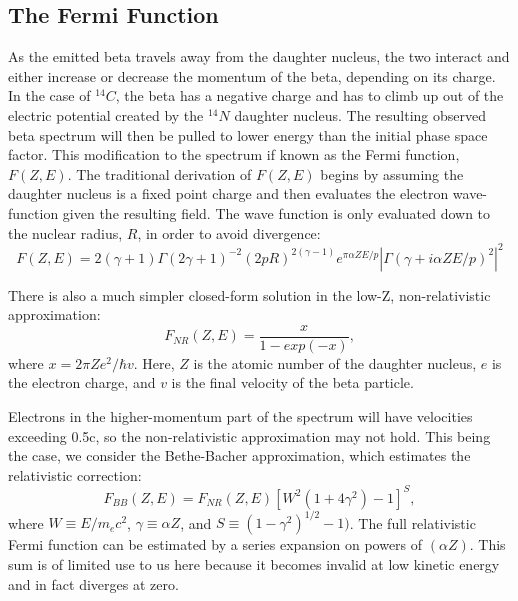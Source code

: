 \subsection{The Fermi Function}\label{sec:fermifunc}
As the emitted beta travels away from the daughter nucleus, the two interact and either increase or decrease the momentum of the beta, depending on its charge. In the case of $^{14}C$, the beta has a negative charge and has to climb up out of the electric potential created by the $^{14}N$ daughter nucleus. The resulting observed beta spectrum will then be pulled to lower energy than the initial phase space factor. This modification to the spectrum if known as the Fermi function, $F(Z,E)$. The traditional derivation of $F(Z,E)$ begins by assuming the daughter nucleus is a fixed point charge and then evaluates the electron wave-function given the resulting field. The wave function is only evaluated down to the nuclear radius, $R$, in order to avoid divergence\cite{wilkinson}:
\begin{equation}\label{eq:fermifunc1}
F(Z,E)=2(\gamma+1)\Gamma(2\gamma+1)^{-2}(2pR)^{2(\gamma-1)}e^{\pi \alpha Z E/p}|\Gamma(\gamma+i\alpha ZE/p)^{2}|^2
\end{equation}

There is also a much simpler closed-form solution in the low-Z, non-relativistic approximation\cite{beta_fermi}:
\begin{equation}\label{eq:fermifunc2}
F_{NR}(Z,E)=\frac{x}{1-exp(-x)},
\end{equation}
where $x=2\pi Ze^{2}/\hbar v$. Here, $Z$ is the atomic number of the daughter nucleus, $e$ is the electron charge, and $v$ is the final velocity of the beta particle. 

Electrons in the higher-momentum part of the spectrum will have velocities exceeding 0.5c, so the non-relativistic approximation may not hold. This being the case, we consider the Bethe-Bacher approximation, which estimates the relativistic correction\cite{beta_fermi,bethe}:
\begin{equation}\label{eq:fermifunc3}
F_{BB}(Z,E)=F_{NR}(Z,E)[W^2(1+4\gamma^2)-1]^S,
\end{equation}
where $W\equiv E/m_ec^2$, $\gamma \equiv \alpha Z$, and $S\equiv (1-\gamma^2)^{1/2}-1)$. The full relativistic Fermi function can be estimated by a series expansion on powers of $(\alpha Z)$\cite{wilkinson,C14_Wietfeldt}. This sum is of limited use to us here because it becomes invalid at low kinetic energy and in fact diverges at zero.

